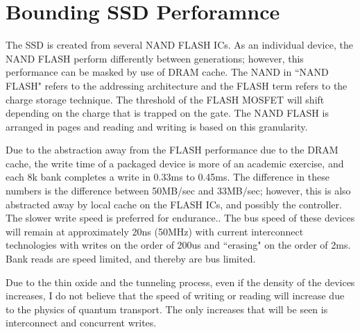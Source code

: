 \documentclass[jounal,letterpaper]{IEEEtran}
\begin{document}
\section{Bounding SSD Perforamnce}
The SSD is created from several NAND FLASH ICs.  As an individual device, the NAND FLASH perform differently between generations; however, this performance can be masked by use of DRAM cache.  The NAND in ``NAND FLASH" refers to the addressing architecture and the FLASH term refers to the charge storage technique.  The threshold of the FLASH MOSFET will shift depending on the charge that is trapped on the gate.  The NAND FLASH is arranged in pages and reading and writing is based on this granularity\cite{goda2012scaling,lue2013novel,chen2012highly}.

Due to the abstraction away from the FLASH performance due to the DRAM cache, the write time of a packaged device is more of an academic exercise, and each 8k bank completes a write in 0.33ms to 0.45ms.  The difference in these numbers is the difference between 50MB/sec and 33MB/sec; however, this is also abstracted away by local cache on the FLASH ICs, and possibly the controller.  The slower write speed is preferred for endurance.\cite{park2015three,kim2013channel}. The bus speed of these devices will remain at approximately 20ns (50MHz) with current interconnect technologies with writes on the order of 200us and ``erasing" on the order of 2ms.  Bank reads are speed limited, and thereby are bus limited. 

Due to the thin oxide and the tunneling process, even if the density of the devices increases, I do not believe that the speed of writing or reading will increase due to the physics of quantum transport.  The only increases that will be seen is interconnect and concurrent writes.  
\end{document}
